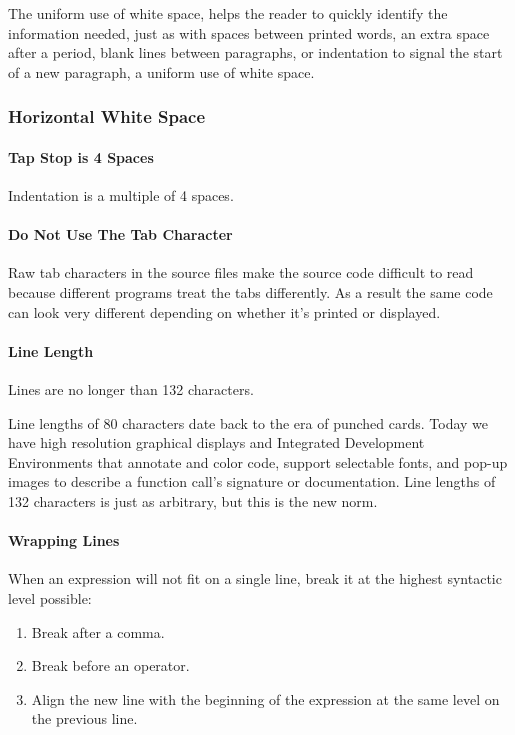 \documentclass[fleqn,12pt]{PARCOneColumn} %
\begin{document}
The uniform use of white space, helps the reader to quickly identify the information needed, just as with spaces between printed words, an extra space after a period, blank lines between paragraphs, or indentation to signal the start of a new paragraph, a uniform use of white space.

\subsubsection{Horizontal White Space}
\paragraph{Tap Stop is 4 Spaces}
Indentation is a multiple of 4 spaces.

\paragraph{Do Not Use The Tab Character}
Raw tab characters in the source files make the source code difficult to read because different programs treat the tabs differently.
As a result the same code can look very different depending on whether it's printed or displayed.

\paragraph{Line Length}
Lines are no longer than 132 characters.

Line lengths of 80 characters date back to the era of punched cards.
Today we have high resolution graphical displays and
Integrated Development Environments that annotate and color code,
support selectable fonts, and pop-up images to describe a function call's signature or documentation.
Line lengths of 132 characters is just as arbitrary, but this is the new norm.

\paragraph{Wrapping Lines}
When an expression will not fit on a single line,
break it at the highest syntactic level possible:

\begin{enumerate}
\item Break after a comma.
\item Break before an operator.
\item Align the new line with the beginning of the expression at the same level
  on the previous line.
\end{enumerate}
\end{document}
